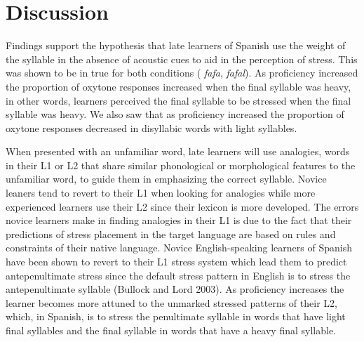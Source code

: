 \documentclass[man]{apa6}
\theoremstyle{definition}
\theoremstyle{definition}
\theoremstyle{definition}
\theoremstyle{remark}
\begin{document}
\section{Discussion}\label{discussion}

Findings support the hypothesis that late learners of Spanish use the
weight of the syllable in the absence of acoustic cues to aid in the
perception of stress. This was shown to be in true for both conditions (
\emph{fafa}, \emph{fafal}). As proficiency increased the proportion of
oxytone responses increased when the final syllable was heavy, in other
words, learners perceived the final syllable to be stressed when the
final syllable was heavy. We also saw that as proficiency increased the
proportion of oxytone responses decreased in disyllabic words with light
syllables.

When presented with an unfamiliar word, late learners will use
analogies, words in their L1 or L2 that share similar phonological or
morphological features to the unfamiliar word, to guide them in
emphasizing the correct syllable. Novice leaners tend to revert to their
L1 when looking for analogies while more experienced learners use their
L2 since their lexicon is more developed. The errors novice learners
make in finding analogies in their L1 is due to the fact that their
predictions of stress placement in the target language are based on
rules and constraints of their native language. Novice English-speaking
learners of Spanish have been shown to revert to their L1 stress system
which lead them to predict antepenultimate stress since the default
stress pattern in English is to stress the antepenultimate syllable
(Bullock and Lord 2003). As proficiency increases the learner becomes
more attuned to the unmarked stressed patterns of their L2, which, in
Spanish, is to stress the penultimate syllable in words that have light
final syllables and the final syllable in words that have a heavy final
syllable.
\end{document}
